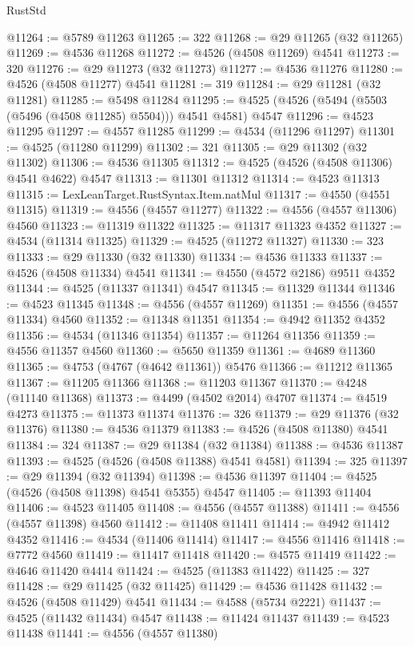 \begin{lexlean}{RustStd}
\begin{coremodule}
@11264 := @5789 @11263
@11265 := 322
@11268 := @29 @11265 (@32 @11265)
@11269 := @4536 @11268
@11272 := @4526 (@4508 @11269) @4541
@11273 := 320
@11276 := @29 @11273 (@32 @11273)
@11277 := @4536 @11276
@11280 := @4526 (@4508 @11277) @4541
@11281 := 319
@11284 := @29 @11281 (@32 @11281)
@11285 := @5498 @11284
@11295 := @4525 (@4526 (@5494 (@5503 (@5496 (@4508 @11285) @5504))) @4541 @4581) @4547
@11296 := @4523 @11295
@11297 := @4557 @11285
@11299 := @4534 (@11296 @11297)
@11301 := @4525 (@11280 @11299)
@11302 := 321
@11305 := @29 @11302 (@32 @11302)
@11306 := @4536 @11305
@11312 := @4525 (@4526 (@4508 @11306) @4541 @4622) @4547
@11313 := @11301 @11312
@11314 := @4523 @11313
@11315 := LexLeanTarget.RustSyntax.Item.natMul
@11317 := @4550 (@4551 @11315)
@11319 := @4556 (@4557 @11277)
@11322 := @4556 (@4557 @11306) @4560
@11323 := @11319 @11322
@11325 := @11317 @11323 @4352
@11327 := @4534 (@11314 @11325)
@11329 := @4525 (@11272 @11327)
@11330 := 323
@11333 := @29 @11330 (@32 @11330)
@11334 := @4536 @11333
@11337 := @4526 (@4508 @11334) @4541
@11341 := @4550 (@4572 @2186) @9511 @4352
@11344 := @4525 (@11337 @11341) @4547
@11345 := @11329 @11344
@11346 := @4523 @11345
@11348 := @4556 (@4557 @11269)
@11351 := @4556 (@4557 @11334) @4560
@11352 := @11348 @11351
@11354 := @4942 @11352 @4352
@11356 := @4534 (@11346 @11354)
@11357 := @11264 @11356
@11359 := @4556 @11357 @4560
@11360 := @5650 @11359
@11361 := @4689 @11360
@11365 := @4753 (@4767 (@4642 @11361)) @5476
@11366 := @11212 @11365
@11367 := @11205 @11366
@11368 := @11203 @11367
@11370 := @4248 (@11140 @11368)
@11373 := @4499 (@4502 @2014) @4707
@11374 := @4519 @4273
@11375 := @11373 @11374
@11376 := 326
@11379 := @29 @11376 (@32 @11376)
@11380 := @4536 @11379
@11383 := @4526 (@4508 @11380) @4541
@11384 := 324
@11387 := @29 @11384 (@32 @11384)
@11388 := @4536 @11387
@11393 := @4525 (@4526 (@4508 @11388) @4541 @4581)
@11394 := 325
@11397 := @29 @11394 (@32 @11394)
@11398 := @4536 @11397
@11404 := @4525 (@4526 (@4508 @11398) @4541 @5355) @4547
@11405 := @11393 @11404
@11406 := @4523 @11405
@11408 := @4556 (@4557 @11388)
@11411 := @4556 (@4557 @11398) @4560
@11412 := @11408 @11411
@11414 := @4942 @11412 @4352
@11416 := @4534 (@11406 @11414)
@11417 := @4556 @11416
@11418 := @7772 @4560
@11419 := @11417 @11418
@11420 := @4575 @11419
@11422 := @4646 @11420 @4414
@11424 := @4525 (@11383 @11422)
@11425 := 327
@11428 := @29 @11425 (@32 @11425)
@11429 := @4536 @11428
@11432 := @4526 (@4508 @11429) @4541
@11434 := @4588 (@5734 @2221)
@11437 := @4525 (@11432 @11434) @4547
@11438 := @11424 @11437
@11439 := @4523 @11438
@11441 := @4556 (@4557 @11380)

\end{coremodule}
\end{lexlean}
